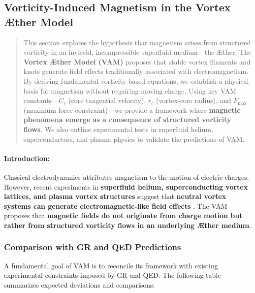 
\subsection{Vorticity-Induced Magnetism in the Vortex Æther Model}


    \begin{abstract}
This section explores the hypothesis that magnetism arises from structured vorticity in an inviscid, incompressible superfluid medium—the Æther. The \textbf{Vortex Æther Model (VAM)} proposes that stable vortex filaments and knots generate field effects traditionally associated with electromagnetism. By deriving fundamental vorticity-based equations, we establish a physical basis for magnetism without requiring moving charge. Using key VAM constants—\( C_e \) (core tangential velocity), \( r_c \) (vortex-core radius), and \( F_{\text{max}} \) (maximum force constraint)—we provide a framework where \textbf{magnetic phenomena emerge as a consequence of structured vorticity flows}.
    We also outline experimental tests in superfluid helium, superconductors, and plasma physics to validate the predictions of VAM.
    \end{abstract}

    \paragraph*{Introduction:}

Classical electrodynamics attributes magnetism to the motion of electric charges. However, recent experiments in \textbf{superfluid helium, superconducting vortex lattices, and plasma vortex structures} suggest that \textbf{neutral vortex systems can generate electromagnetic-like field effects} \cite{superfluid_he_interferometers}. The VAM proposes that \textbf{magnetic fields do not originate from charge motion but rather from structured vorticity flows in an underlying Æther medium}.

\subsubsection*{Comparison with GR and QED Predictions}
A fundamental goal of VAM is to reconcile its framework with existing experimental constraints imposed by GR and QED. The following table summarizes expected deviations and comparisons:

